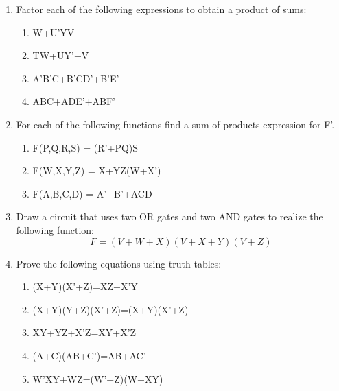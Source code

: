 \documentclass[12pt]{article}
\begin{document}
\begin{enumerate}
     \addtocounter{enumi}{1}\item Factor each of the following expressions to obtain a product of sums:
     \begin{enumerate}
         \item W+U'YV
         \item TW+UY'+V
         \item A'B'C+B'CD'+B'E'
         \item ABC+ADE'+ABF'
     \end{enumerate}
     \addtocounter{enumi}{1}\item For each of the following functions find a sum-of-products expression for F'.
     \begin{enumerate}
         \item F(P,Q,R,S) = (R'+PQ)S
         \item F(W,X,Y,Z) = X+YZ(W+X')
         \item F(A,B,C,D) = A'+B'+ACD
     \end{enumerate}
     \addtocounter{enumi}{1}\item Draw a circuit that uses two OR gates and two AND gates to realize the following function:
        \[F=(V+W+X)(V+X+Y)(V+Z)\]
    \addtocounter{enumi}{1}\item Prove the following equations using truth tables:
    \begin{enumerate}
        \item (X+Y)(X'+Z)=XZ+X'Y
        \item (X+Y)(Y+Z)(X'+Z)=(X+Y)(X'+Z)
        \item XY+YZ+X'Z=XY+X'Z
        \item (A+C)(AB+C')=AB+AC'
        \item W'XY+WZ=(W'+Z)(W+XY)
    \end{enumerate}
    
    \exists \forall
    
      
\end{enumerate}
\end{document}
